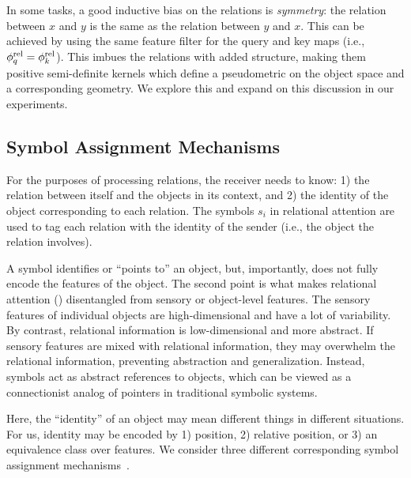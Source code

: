 In some tasks, a good inductive bias on the relations is \textit{symmetry}: the relation between $x$ and $y$ is the same as the relation between $y$ and $x$. This can be achieved by using the same feature filter for the query and key maps (i.e., $\phi_q^{\mathrm{rel}} = \phi_k^{\mathrm{rel}}$). This imbues the relations with added structure, making them positive semi-definite kernels which define a pseudometric on the object space and a corresponding geometry. We explore this and expand on this discussion in our experiments.

\subsection{Symbol Assignment Mechanisms}

For the purposes of processing relations, the receiver needs to know: 1) the relation between itself and the objects in its context, and 2) the identity of the object corresponding to each relation.
The symbols $s_i$ in relational attention are used to tag each relation with the identity of the sender  (i.e., the object the relation involves). 


A symbol identifies or ``points to'' an object, but, importantly, does not fully encode the features of the object. The second point is what makes relational attention () disentangled from sensory or object-level features. The sensory features of individual objects are high-dimensional and have a lot of variability. By contrast, relational information is low-dimensional and more abstract. If sensory features are mixed with relational information, they may overwhelm the relational information, preventing abstraction and generalization. Instead, symbols act as abstract references to objects, which can be viewed as a connectionist analog of pointers in traditional symbolic systems.

Here, the ``identity'' of an object may mean different things in different situations. For us, identity may be encoded by 1) position, 2) relative position, or 3) an equivalence class over features. We consider three different corresponding symbol assignment mechanisms~\citep{altabaa2024abstractors}.

